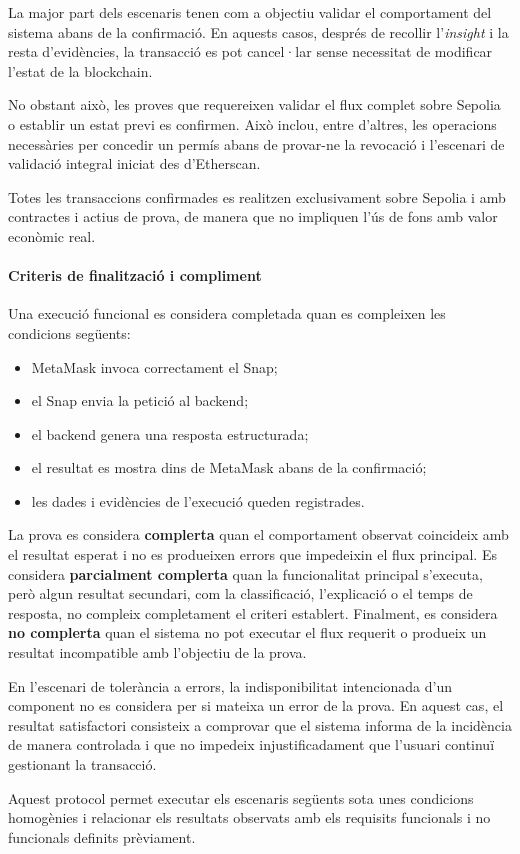 La major part dels escenaris tenen com a objectiu validar el comportament del sistema abans de la confirmació. En aquests casos, després de recollir l'\textit{insight} i la resta d'evidències, la transacció es pot cancel·lar sense necessitat de modificar l'estat de la blockchain.

No obstant això, les proves que requereixen validar el flux complet sobre Sepolia o establir un estat previ es confirmen. Això inclou, entre d'altres, les operacions necessàries per concedir un permís abans de provar-ne la revocació i l'escenari de validació integral iniciat des d'Etherscan.

Totes les transaccions confirmades es realitzen exclusivament sobre Sepolia i amb contractes i actius de prova, de manera que no impliquen l'ús de fons amb valor econòmic real.

\paragraph{Criteris de finalització i compliment}

Una execució funcional es considera completada quan es compleixen les condicions següents:

\begin{itemize}
    \item MetaMask invoca correctament el Snap;
    \item el Snap envia la petició al backend;
    \item el backend genera una resposta estructurada;
    \item el resultat es mostra dins de MetaMask abans de la confirmació;
    \item les dades i evidències de l'execució queden registrades.
\end{itemize}

La prova es considera \textbf{complerta} quan el comportament observat coincideix amb el resultat esperat i no es produeixen errors que impedeixin el flux principal. Es considera \textbf{parcialment complerta} quan la funcionalitat principal s'executa, però algun resultat secundari, com la classificació, l'explicació o el temps de resposta, no compleix completament el criteri establert. Finalment, es considera \textbf{no complerta} quan el sistema no pot executar el flux requerit o produeix un resultat incompatible amb l'objectiu de la prova.

En l'escenari de tolerància a errors, la indisponibilitat intencionada d'un component no es considera per si mateixa un error de la prova. En aquest cas, el resultat satisfactori consisteix a comprovar que el sistema informa de la incidència de manera controlada i que no impedeix injustificadament que l'usuari continuï gestionant la transacció.

Aquest protocol permet executar els escenaris següents sota unes condicions homogènies i relacionar els resultats observats amb els requisits funcionals i no funcionals definits prèviament.
